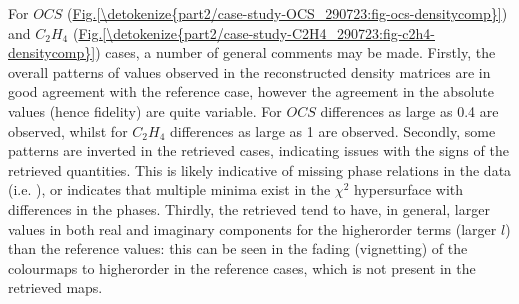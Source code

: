\documentclass[letterpaper,table,10pt,english]{jupyterBook}
\begin{document}
\sphinxAtStartPar
For \(OCS\) (\hyperref[\detokenize{part2/case-study-OCS_290723:fig-ocs-densitycomp}]{Fig.\@ \ref{\detokenize{part2/case-study-OCS_290723:fig-ocs-densitycomp}}}) and \(C_2H_4\) (\hyperref[\detokenize{part2/case-study-C2H4_290723:fig-c2h4-densitycomp}]{Fig.\@ \ref{\detokenize{part2/case-study-C2H4_290723:fig-c2h4-densitycomp}}}) cases, a number of general comments may be made. Firstly, the overall patterns of values observed in the reconstructed density matrices are in good agreement with the reference case, however the agreement in the absolute values (hence fidelity) are quite variable. For \(OCS\) differences as large as 0.4 are observed, whilst for \(C_2H_4\) differences as large as 1 are observed. Secondly, some patterns are inverted in the retrieved cases, indicating issues with the signs of the retrieved quantities. This is likely indicative of missing phase relations in the data (i.e. {\hyperref[\detokenize{backmatter/glossary:term-channel-functions}]{}}), or indicates that multiple minima exist in the \(\chi^2\) hypersurface with differences in the phases. Thirdly, the retrieved {\hyperref[\detokenize{backmatter/glossary:term-radial-matrix-elements}]{}} tend to have, in general, larger values in both real and imaginary components for the higher\sphinxhyphen{}order terms (larger \(l\)) than the reference values: this can be seen in the fading (vignetting) of the colourmaps to higher\sphinxhyphen{}order in the reference cases, which is not present in the retrieved maps.
\end{document}
